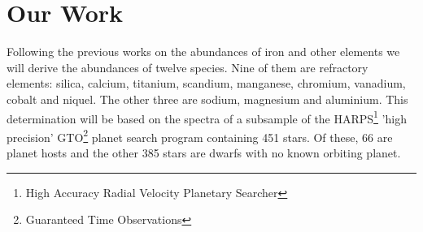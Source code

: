 \documentclass[dvips,12pt,a4paper]{report}
\begin{document}
{%






\section {Our Work}


Following the previous works on the abundances of iron and other elements we will derive the abundances of twelve species. Nine of them are refractory elements: silica, calcium, titanium, scandium, manganese, chromium, vanadium, cobalt and niquel. The other three are sodium, magnesium and aluminium. This determination will be based on the spectra of a subsample of the HARPS\footnote{High Accuracy Radial Velocity Planetary Searcher} 'high precision' GTO\footnote{Guaranteed Time Observations} planet search program containing 451 stars. Of these, 66 are planet hosts and the other 385 stars are dwarfs with no known orbiting planet. 

}
\end{document}
